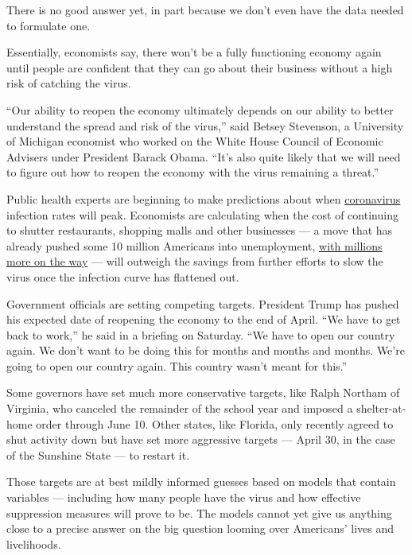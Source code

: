 There is no good answer yet, in part because we don't even have the data
needed to formulate one.

Essentially, economists say, there won't be a fully functioning economy
again until people are confident that they can go about their business
without a high risk of catching the virus.

``Our ability to reopen the economy ultimately depends on our ability to
better understand the spread and risk of the virus,'' said Betsey
Stevenson, a University of Michigan economist who worked on the White
House Council of Economic Advisers under President Barack Obama. ``It's
also quite likely that we will need to figure out how to reopen the
economy with the virus remaining a threat.''

Public health experts are beginning to make predictions about when
\href{https://www.nytimes3xbfgragh.onion/2020/04/13/business/coronavirus-economy.html}{coronavirus}
infection rates will peak. Economists are calculating when the cost of
continuing to shutter restaurants, shopping malls and other businesses
--- a move that has already pushed some 10 million Americans into
unemployment,
\href{https://www.nytimes3xbfgragh.onion/2020/04/03/upshot/coronavirus-jobless-rate-great-depression.html}{with
millions more on the way} --- will outweigh the savings from further
efforts to slow the virus once the infection curve has flattened out.

Government officials are setting competing targets. President Trump has
pushed his expected date of reopening the economy to the end of April.
``We have to get back to work,'' he said in a briefing on Saturday. ``We
have to open our country again. We don't want to be doing this for
months and months and months. We're going to open our country again.
This country wasn't meant for this.''

Some governors have set much more conservative targets, like Ralph
Northam of Virginia, who canceled the remainder of the school year and
imposed a shelter-at-home order through June 10. Other states, like
Florida, only recently agreed to shut activity down but have set more
aggressive targets --- April 30, in the case of the Sunshine State ---
to restart it.

Those targets are at best mildly informed guesses based on models that
contain variables --- including how many people have the virus and how
effective suppression measures will prove to be. The models cannot yet
give us anything close to a precise answer on the big question looming
over Americans' lives and livelihoods.

